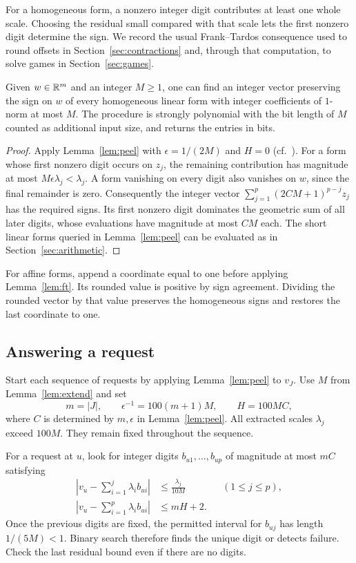 For a homogeneous form, a nonzero integer digit contributes at least
one whole scale. Choosing the residual small compared with that scale
lets the first nonzero digit determine the sign. We record the usual
Frank--Tardos consequence used to round offsets in
Section~\ref{sec:contractions} and, through that computation, to
solve games in Section~\ref{sec:games}.

\begin{lemma}\label{lem:ft}
Given \(w\in\mathbb R^m\) and an integer \(M\ge1\), one can find an integer
vector preserving the sign on \(w\) of every homogeneous linear form
with integer coefficients of \(1\)-norm at most \(M\). The procedure
is strongly polynomial with the bit length of \(M\) counted as
additional input size, and returns the entries in bits.
\end{lemma}
\begin{proof}
Apply Lemma~\ref{lem:peel} with \(\epsilon=1/(2M)\) and \(H=0\)
(cf.\ \cite[Theorem~(6.2.13)]{GLS}). For a form whose first nonzero
digit occurs on \(z_j\), the remaining contribution has magnitude
at most \(M\epsilon\lambda_j<\lambda_j\). A form vanishing on every
digit also vanishes on \(w\), since the final remainder is zero.
Consequently the integer vector
\(\sum_{j=1}^p(2CM+1)^{p-j}z_j\) has the required signs. Its first
nonzero digit dominates the geometric sum of all later digits,
whose evaluations have magnitude at most \(CM\) each. The short
linear forms queried in Lemma~\ref{lem:peel} can be evaluated as in
Section~\ref{sec:arithmetic}.
\end{proof}

For affine forms, append a coordinate equal to one before applying
Lemma~\ref{lem:ft}. Its rounded value is positive by sign agreement.
Dividing the rounded vector by that value preserves the homogeneous
signs and restores the last coordinate to one.

\subsection{Answering a request}

Start each sequence of requests by applying Lemma~\ref{lem:peel} to
\(v_J\). Use \(M\) from Lemma~\ref{lem:extend} and set
\[
 m=|J|,\qquad \epsilon^{-1}=100(m+1)M,\qquad H=100MC ,
\]
where \(C\) is determined by \(m,\epsilon\) in Lemma~\ref{lem:peel}.
All extracted scales \(\lambda_j\) exceed \(100M\). They remain fixed
throughout the sequence.

For a request at \(u\), look for integer digits \(b_{u1},\ldots,b_{up}\)
of magnitude at most \(mC\) satisfying
\begin{equation}\label{eq:request}
 \begin{aligned}
 \left|v_u-\sum_{i=1}^j\lambda_i b_{ui}\right|
       &\le\frac{\lambda_j}{10M} && (1\le j\le p),\\
 \left|v_u-\sum_{i=1}^p\lambda_i b_{ui}\right|
       &\le mH+2 .
 \end{aligned}
\end{equation}
Once the previous digits are fixed, the permitted interval for
\(b_{uj}\) has length \(1/(5M)<1\). Binary search therefore finds the
unique digit or detects failure. Check the last residual bound even if
there are no digits.

